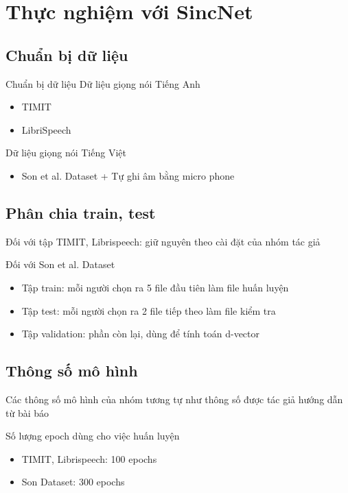 \documentclass[notheorems, aspectratio=54]{beamer}
\begin{document}
\section{Thực nghiệm với SincNet}
\subsection{Chuẩn bị dữ liệu}
\begin{frame}{Chuẩn bị dữ liệu}
	Dữ liệu giọng nói Tiếng Anh
	\begin{itemize}
		\item TIMIT
		\item LibriSpeech
	\end{itemize}
	Dữ liệu giọng nói Tiếng Việt
	\begin{itemize}
		\item Son et al. Dataset + Tự ghi âm bằng micro phone
	\end{itemize}
\end{frame}
\subsection{Phân chia train, test}
\begin{frame}
	Đối với tập TIMIT, Librispeech:  giữ nguyên theo cài đặt của nhóm tác giả
	
	Đối với Son et al. Dataset
	\begin{itemize}
		\item Tập train: mỗi người chọn ra 5 file đầu tiên làm file huấn luyện
		\item Tập test: mỗi người chọn ra 2 file tiếp theo làm file kiểm tra
		\item Tập validation: phần còn lại, dùng để tính toán d-vector
	\end{itemize}
\end{frame}
\subsection{Thông số mô hình}
\begin{frame}
	Các thông số mô hình của nhóm tương tự như thông số được tác giả hướng dẫn từ bài báo
	
	Số lượng epoch dùng cho việc huấn luyện
	\begin{itemize}
		\item TIMIT, Librispeech: 100 epochs
		\item Son Dataset: 300 epochs
	\end{itemize}
\end{frame}
\end{document}
